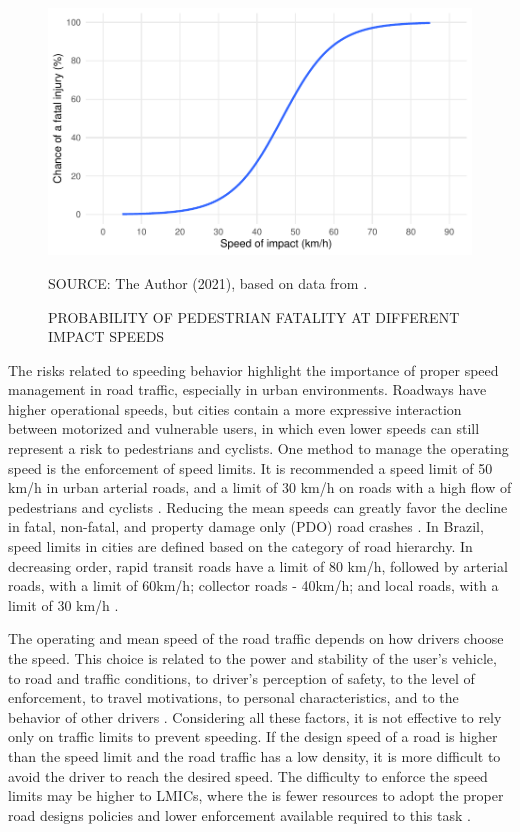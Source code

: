 \begin{figure}[!htbp]
    \centering\footnotesize
    \captionsetup{font=footnotesize}
    \caption{PROBABILITY OF PEDESTRIAN FATALITY AT DIFFERENT IMPACT SPEEDS}
    \includegraphics{fig/ash.pdf}
    \label{fig:ash}
    \par SOURCE: The Author (2021), based on data from \textcite{Ashton1980}.
\end{figure}

The risks related to speeding behavior highlight the importance of proper speed management in road traffic, especially in urban environments. Roadways have higher operational speeds, but cities contain a more expressive interaction between motorized and vulnerable users, in which even lower speeds can still represent a risk to pedestrians and cyclists. One method to manage the operating speed is the enforcement of speed limits. It is recommended a speed limit of 50 km/h in urban arterial roads, and a limit of 30 km/h on roads with a high flow of pedestrians and cyclists \cite{WHO2008}. Reducing the mean speeds can greatly favor the decline in fatal, non-fatal, and property damage only (PDO) road crashes \cite{Elvik2013}. In Brazil, speed limits in cities are defined based on the category of road hierarchy. In decreasing order, rapid transit roads have a limit of 80 km/h, followed by arterial roads, with a limit of 60km/h; collector roads - 40km/h; and local roads, with a limit of 30 km/h \cite{Brasil1997}.

The operating and mean speed of the road traffic depends on how drivers choose the speed. This choice is related to the power and stability of the user's vehicle, to road and traffic conditions, to driver's perception of safety, to the level of enforcement, to travel motivations, to personal characteristics, and to the behavior of other drivers \cite{Mohan2016a, Shinar2017}. Considering all these factors, it is not effective to rely only on traffic limits to prevent speeding. If the design speed of a road is higher than the speed limit and the road traffic has a low density, it is more difficult to avoid the driver to reach the desired speed. The difficulty to enforce the speed limits may be higher to LMICs, where the is fewer resources to adopt the proper road designs policies and lower enforcement available required to this task \cite{Mohan2016a}. 

